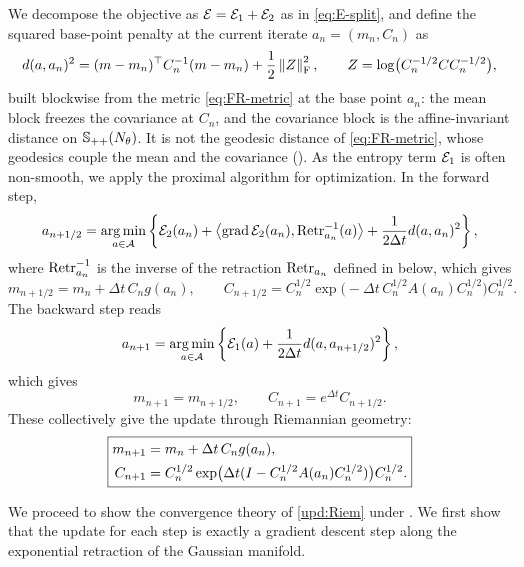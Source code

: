 We decompose the objective as $\mathcal{E}=\mathcal{E}_1+\mathcal{E}_2$ as in \eqref{eq:E-split}, and define
the squared base-point penalty at the current iterate $a_n=(m_n,C_n)$ as
\begin{equation}\label{eq:Riem-dist}
    d(a,a_n)^2
    =
    (m-m_n)^\top C_n^{-1}(m-m_n)+\frac12\left\lVert Z\right\rVert_{\mathrm{F}}^2,
    \qquad
    Z=\log\bigl(C_n^{-1/2}CC_n^{-1/2}\bigr),
\end{equation}
built blockwise from the metric \eqref{eq:FR-metric} at the base point $a_n$: the mean block
freezes the covariance at $C_n$, and the covariance block is the affine-invariant distance on
$\mathbb{S}_{++}(N_\theta)$. It is not the geodesic distance of \eqref{eq:FR-metric}, whose geodesics
couple the mean and the covariance (). As the entropy term $\mathcal{E}_1$ is
often non-smooth, we apply the proximal algorithm \citep{parikh2014proximal} for optimization.
In the forward step,
\begin{equation*}
    a_{n+1/2}
    =
    \operatorname*{arg\,min}_{a\in\mathcal{A}}
    \left\{
        \mathcal{E}_2(a_n)+\left\langle \operatorname{grad}\mathcal{E}_2(a_n),\operatorname{Retr}_{a_n}^{-1}(a)\right\rangle+\frac1{2\Delta t}d(a,a_n)^2
    \right\},
\end{equation*}
where $\operatorname{Retr}_{a_n}^{-1}$ is the inverse of the retraction $\operatorname{Retr}_{a_n}$ defined in
 below, which gives
\begin{equation*}
    m_{n+1/2}=m_n+\Delta t\,C_ng(a_n),
    \qquad
    C_{n+1/2}=C_n^{1/2}\exp\bigl(-\Delta t\,C_n^{1/2}A(a_n)C_n^{1/2}\bigr)C_n^{1/2}.
\end{equation*}
The backward step reads
\begin{equation*}
    a_{n+1}
    =
    \operatorname*{arg\,min}_{a\in\mathcal{A}}
    \left\{\mathcal{E}_1(a)+\frac1{2\Delta t}d(a,a_{n+1/2})^2\right\},
\end{equation*}
which gives
\begin{equation*}
    m_{n+1}=m_{n+1/2},
    \qquad
    C_{n+1}=e^{\Delta t}C_{n+1/2}.
\end{equation*}
These collectively give the update through Riemannian geometry:
\begin{equation}\label{upd:Riem}
    \boxed{
    \begin{aligned}
        m_{n+1} &= m_n+\Delta t\,C_ng(a_n), \\
        C_{n+1} &= C_n^{1/2}
        \exp\bigl(\Delta t(I-C_n^{1/2}A(a_n)C_n^{1/2})\bigr)C_n^{1/2}.
    \end{aligned}}
\end{equation}

We proceed to show the convergence theory of \eqref{upd:Riem} under
. We first show that the update for each step is exactly a
gradient descent step along the exponential retraction of the Gaussian manifold.

